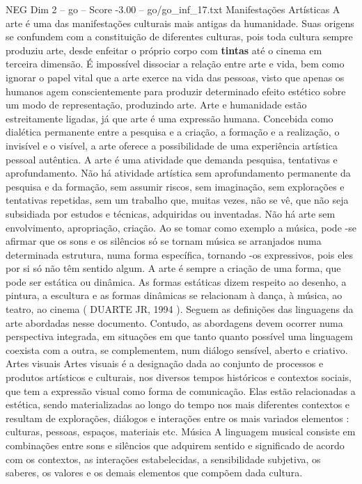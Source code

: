 \begin{textsample}{NEG Dim 2 – go – Score -3.00 – go/go\_inf\_17.txt}
Manifestações Artísticas A arte é uma das manifestações culturais mais antigas da humanidade.
Suas origens se confundem com a constituição de diferentes culturas, pois toda cultura sempre produziu arte, desde enfeitar o próprio corpo com \textbf{tintas} até o cinema em terceira dimensão.
É impossível dissociar a relação entre arte e vida, bem como ignorar o papel vital que a arte exerce na vida das pessoas, visto que apenas os humanos agem conscientemente para produzir determinado efeito estético sobre um modo de representação, produzindo arte.
Arte e humanidade estão estreitamente ligadas, já que arte é uma expressão humana.
Concebida como dialética permanente entre a pesquisa e a criação, a formação e a realização, o invisível e o visível, a arte oferece a possibilidade de uma experiência artística pessoal autêntica.
A arte é uma atividade que demanda pesquisa, tentativas e aprofundamento.
Não há atividade artística sem aprofundamento permanente da pesquisa e da formação, sem assumir riscos, sem imaginação, sem explorações e tentativas repetidas, sem um trabalho que, muitas vezes, não se vê, que não seja subsidiada por estudos e técnicas, adquiridas ou inventadas.
Não há arte sem envolvimento, apropriação, criação.
Ao se tomar como exemplo a música, pode -se afirmar que os sons e os silêncios só se tornam música se arranjados numa determinada estrutura, numa forma específica, tornando -os expressivos, pois eles por si só não têm sentido algum.
A arte é sempre a criação de uma forma, que pode ser estática ou dinâmica.
As formas estáticas dizem respeito ao desenho, a pintura, a escultura e as formas dinâmicas se relacionam à dança, à música, ao teatro, ao cinema ( DUARTE JR, 1994 ).
Seguem as definições das linguagens da arte abordadas nesse documento.
Contudo, as abordagens devem ocorrer numa perspectiva integrada, em situações em que tanto quanto possível uma linguagem coexista com a outra, se complementem, num diálogo sensível, aberto e criativo.
Artes visuais Artes visuais é a designação dada ao conjunto de processos e produtos artísticos e culturais, nos diversos tempos históricos e contextos sociais, que tem a expressão visual como forma de comunicação.
Elas estão relacionadas a estética, sendo materializadas ao longo do tempo nos mais diferentes contextos e resultam de explorações, diálogos e interações entre os mais variados elementos : culturas, pessoas, espaços, materiais etc.
Música A linguagem musical consiste em combinações entre sons e silêncios que adquirem sentido e significado de acordo com os contextos, as interações estabelecidas, a sensibilidade subjetiva, os saberes, os valores e os demais elementos que compõem dada cultura.

\end{textsample}
